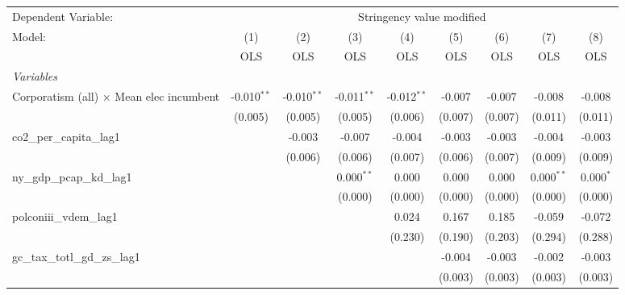 
\begingroup
\centering
\begin{tabular}{lcccccccc}
   \toprule
   Dependent Variable: & \multicolumn{8}{c}{Stringency value modified}\\
   Model:                                          & (1)           & (2)           & (3)           & (4)           & (5)     & (6)     & (7)          & (8)\\  
                                                   &  OLS          & OLS           & OLS           & OLS           & OLS     & OLS     & OLS          & OLS\\  
   \midrule
   \emph{Variables}\\
   Corporatism (all) $\times$ Mean elec incumbent  & -0.010$^{**}$ & -0.010$^{**}$ & -0.011$^{**}$ & -0.012$^{**}$ & -0.007  & -0.007  & -0.008       & -0.008\\   
                                                   & (0.005)       & (0.005)       & (0.005)       & (0.006)       & (0.007) & (0.007) & (0.011)      & (0.011)\\   
   co2\_per\_capita\_lag1                          &               & -0.003        & -0.007        & -0.004        & -0.003  & -0.003  & -0.004       & -0.003\\   
                                                   &               & (0.006)       & (0.006)       & (0.007)       & (0.006) & (0.007) & (0.009)      & (0.009)\\   
   ny\_gdp\_pcap\_kd\_lag1                         &               &               & 0.000$^{**}$  & 0.000         & 0.000   & 0.000   & 0.000$^{**}$ & 0.000$^{*}$\\   
                                                   &               &               & (0.000)       & (0.000)       & (0.000) & (0.000) & (0.000)      & (0.000)\\   
   polconiii\_vdem\_lag1                           &               &               &               & 0.024         & 0.167   & 0.185   & -0.059       & -0.072\\   
                                                   &               &               &               & (0.230)       & (0.190) & (0.203) & (0.294)      & (0.288)\\   
   gc\_tax\_totl\_gd\_zs\_lag1                     &               &               &               &               & -0.004  & -0.003  & -0.002       & -0.003\\   
                                                   &               &               &               &               & (0.003) & (0.003) & (0.003)      & (0.003)\\   

\end{tabular}
